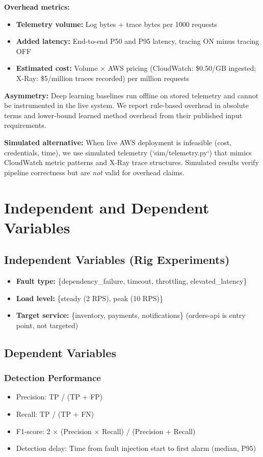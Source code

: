 \textbf{Overhead metrics:}
\begin{itemize}
    \item \textbf{Telemetry volume:} Log bytes + trace bytes per 1000 requests
    \item \textbf{Added latency:} End-to-end P50 and P95 latency, tracing ON minus tracing OFF
    \item \textbf{Estimated cost:} Volume × AWS pricing (CloudWatch: \$0.50/GB ingested; X-Ray: \$5/million traces recorded) per million requests
\end{itemize}

\textbf{Asymmetry:} Deep learning baselines run offline on stored telemetry and cannot be instrumented in the live system. We report rule-based overhead in absolute terms and lower-bound learned method overhead from their published input requirements.

\textbf{Simulated alternative:} When live AWS deployment is infeasible (cost, credentials, time), we use simulated telemetry (`sim/telemetry.py`) that mimics CloudWatch metric patterns and X-Ray trace structures. Simulated results verify pipeline correctness but are \textit{not} valid for overhead claims.

\section{Independent and Dependent Variables}

\subsection{Independent Variables (Rig Experiments)}

\begin{itemize}
    \item \textbf{Fault type:} \{dependency\_failure, timeout, throttling, elevated\_latency\}
    \item \textbf{Load level:} \{steady (2 RPS), peak (10 RPS)\}
    \item \textbf{Target service:} \{inventory, payments, notifications\} (orders-api is entry point, not targeted)
\end{itemize}

\subsection{Dependent Variables}

\subsubsection{Detection Performance}
\begin{itemize}
    \item Precision: TP / (TP + FP)
    \item Recall: TP / (TP + FN)
    \item F1-score: 2 × (Precision × Recall) / (Precision + Recall)
    \item Detection delay: Time from fault injection start to first alarm (median, P95)
\end{itemize}

